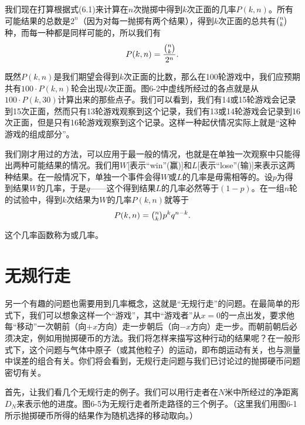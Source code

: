 \documentclass[12pt,oneside]{book}
\begin{document}
\begin{common-format}
我们现在打算根据式(6.1)来计算在$n$次抛掷中得到$k$次正面的几率$P(k,n)$。所有可能结果的总数是$2^n$（因为对每一抛掷有两个结果），得到$k$次正面的总共有$\tbinom{n}{k}$种，而每一种都是同样可能的，所以我们有
\begin{equation}
\label{Eq:I:6:5}
P(k,n)=\frac{\tbinom{n}{k}}{2^n}.
\end{equation}

既然$P(k,n)$是我们期望会得到$k$次正面的比数，那么在100轮游戏中，我们应预期共有$100\cdot P(k,n)$轮会出现$k$次正面。图6-2中虚线所经过的各点就是从$100 \cdot P(k,30)$计算出来的那些点子。我们可以看到，我们有14或15轮游戏会记录到15次正面，然而只有13轮游戏观察到这个记录，我们有13或14轮游戏会记录到16次正面，但是只有16轮游戏观察到这个记录。这样一种起伏情况实际上就是“这种游戏的组成部分”。

我们刚才用过的方法，可以应用于最一般的情况，也就是在单独一次观察中只能得出两种可能结果的情况。我们用$W$[表示“win”(赢)]和$L$[表示“lose”(输)]来表示这两种结果。在一般情况下，单独一个事件会得$W$或$L$的几率是毋需相等的。设$p$为得到结果$W$的几率，于是$q$——这个得到结果$L$的几率必然等于$(1-p)$。在一组$n$轮的试验中，得到$k$次结果为$W$的几率$P(k,n)$就等于
\begin{equation}
\label{Eq:I:6:6}
P(k,n)=\tbinom{n}{k}p^kq^{n-k}.
\end{equation}

这个几率函数称为或几率。


\section{无规行走}
另一个有趣的问题也需要用到几率概念，这就是“无规行走”的问题。在最简单的形式下，我们可以想象这样一个“游戏”，其中“游戏者”从$x=0$的一点出发，要求他每“移动”一次朝前（向$+x$方向）走一步朝后（向$-x$方向）走一步。而朝前朝后必须决定，例如用抛掷硬币的方法。我们将怎样来描写这种行动的结果呢？在一般形式下，这个问题与气体中原子（或其他粒子）的运动，即布朗运动有关，也与测量中误差的组合有关。你们将会看到，无规行走问题与我们已讨论过的抛掷硬币问题密切有关。

首先，让我们看几个无规行走的例子。我们可以用行走者在$N$米中所经过的净距离$D_N$来表示他的进度。图6-5为无规行走者所走路径的三个例子。（这里我们用图6-1所示抛掷硬币所得的结果作为随机选择的移动取向。）


\end{common-format}
\end{document}
